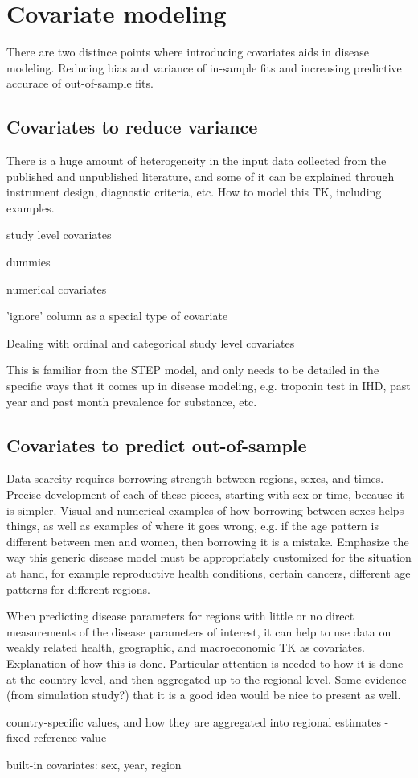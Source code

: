 \section{Covariate modeling}

There are two distince points where introducing covariates aids in
disease modeling.  Reducing bias and variance of in-sample fits and
increasing predictive accurace of out-of-sample fits.

\subsection{Covariates to reduce variance}

There is a huge amount of heterogeneity in the input data collected
from the published and unpublished literature, and some of it can be
explained through instrument design, diagnostic criteria, etc. How to
model this TK, including examples.

study level covariates

dummies

numerical covariates

'ignore' column as a special type of covariate

Dealing with ordinal and categorical study level covariates

This is familiar from the STEP model, and only needs to be detailed in
the specific ways that it comes up in disease modeling, e.g. troponin
test in IHD, past year and past month prevalence for substance, etc.


\subsection{Covariates to predict out-of-sample}

Data scarcity requires borrowing strength between regions, sexes, and
times. Precise development of each of these pieces, starting with sex
or time, because it is simpler. Visual and numerical examples of how
borrowing between sexes helps things, as well as examples of where it
goes wrong, e.g. if the age pattern is different between men and
women, then borrowing it is a mistake. Emphasize the way this generic
disease model must be appropriately customized for the situation at
hand, for example reproductive health conditions, certain cancers,
different age patterns for different regions.

When predicting disease parameters for regions with little or no
direct measurements of the disease parameters of interest, it can help
to use data on weakly related health, geographic, and macroeconomic TK
as covariates. Explanation of how this is done.  Particular attention
is needed to how it is done at the country level, and then aggregated
up to the regional level. Some evidence (from simulation study?) that
it is a good idea would be nice to present as well.

country-specific values, and how they are aggregated into regional
estimates - fixed reference value

built-in covariates: sex, year, region


